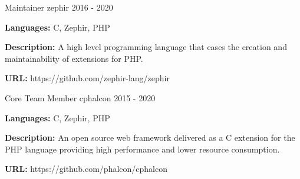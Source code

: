 \begin{cventries}
  \cventry
    {Maintainer}
    {zephir}
    {}
    {2016 - 2020}
    {
      \begin{cvitems}
        \item {\textbf{Languages:} C, Zephir, PHP}
        \item {\textbf{Description:} A high level programming language that eases the creation and maintainability of extensions for PHP.}
        \item {\textbf{URL:} https://github.com/zephir-lang/zephir}
      \end{cvitems}
    }

  \cventry
    {Core Team Member}
    {cphalcon}
    {}
    {2015 - 2020}
    {
      \begin{cvitems}
        \item {\textbf{Languages:} C, Zephir, PHP}
        \item {\textbf{Description:} An open source web framework delivered as a C extension for the PHP language providing high performance and lower resource consumption.}
        \item {\textbf{URL:} https://github.com/phalcon/cphalcon}
      \end{cvitems}
    }

\end{cventries}

